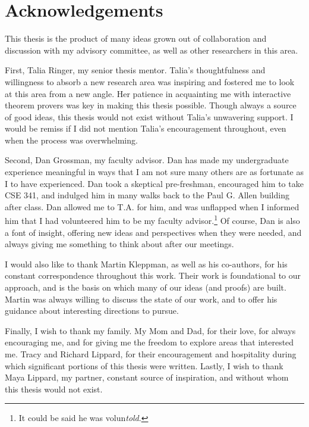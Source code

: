 \chapter*{Acknowledgements}

This thesis is the product of many ideas grown out of collaboration and
discussion with my advisory committee, as well as other researchers in this
area.

First, Talia Ringer, my senior thesis mentor. Talia's thoughtfulness and
willingness to absorb a new research area was inspiring and fostered me to
look at this area from a new angle. Her patience in acquainting me with
interactive theorem provers was key in making this thesis possible. Though
always a source of good ideas, this thesis would not exist without Talia's
unwavering support. I would be remiss if I did not mention Talia's encouragement
throughout, even when the process was overwhelming.

Second, Dan Grossman, my faculty advisor. Dan has made my undergraduate
experience meaningful in ways that I am not sure many others are as fortunate as
I to have experienced. Dan took a skeptical pre-freshman, encouraged him to take
CSE 341, and indulged him in many walks back to the Paul G. Allen building after
class. Dan allowed me to T.A. for him, and was unflapped when I informed him
that I had volunteered him to be my faculty advisor.\footnote{It could be said
he was volun\textit{told}.} Of course, Dan is also a font of insight, offering
new ideas and perspectives when they were needed, and always giving me something
to think about after our meetings.

I would also like to thank Martin Kleppman, as well as his co-authors, for his
constant correspondence throughout this work. Their work is foundational to our
approach, and is the basis on which many of our ideas (and proofs) are built.
Martin was always willing to discuss the state of our work, and to offer his
guidance about interesting directions to pursue.

Finally, I wish to thank my family. My Mom and Dad, for their love, for always
encouraging me, and for giving me the freedom to explore areas that interested
me. Tracy and Richard Lippard, for their encouragement and hospitality during
which significant portions of this thesis were written. Lastly, I wish to thank
Maya Lippard, my partner, constant source of inspiration, and without whom this
thesis would not exist.

